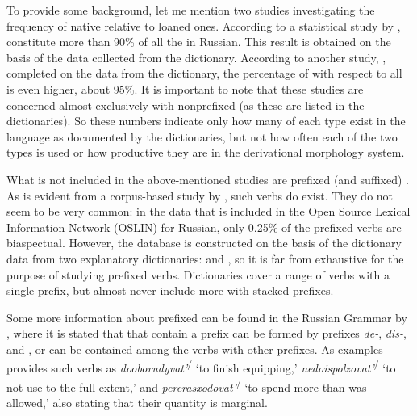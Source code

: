 To provide some background, let me mention two studies investigating the frequency of native  relative to loaned ones. According to a statistical study by \citet{Certkova:98},  constitute more than 90\% of all the  in Russian. This result is obtained on the basis of the data collected from the \citet{Ozegov:90} dictionary. According to another study, \citet{Anderson:02}, completed on the data from the \citet{Zaliznjak:77} dictionary, the percentage of  with respect to all  is even higher, about 95\%. It is important to note that these studies are concerned almost exclusively with nonprefixed  (as these are listed in the dictionaries). So these numbers indicate only how many  of each type exist in the language as documented by the dictionaries, but not how often each of the two types is used or how productive they are in the derivational morphology system.

What is not included in the above-mentioned studies are prefixed (and suffixed) . As is evident from a corpus-based study by \citet{Borik:12}, such verbs do exist. They do not seem to be very common: in the data that is included in the Open Source Lexical Information Network (OSLIN) for Russian, only 0.25\% of the prefixed verbs are biaspectual. However, the database is constructed on the basis of the dictionary data from two explanatory dictionaries: \citet{Ushakov:50} and \citet{OzegovShvedova:92}, so it is far from exhaustive for the purpose of studying prefixed verbs. Dictionaries cover a range of verbs with a single prefix, but almost never include more  with stacked prefixes. 

Some more information about prefixed  can be found in the Russian Grammar by \citet{Shvedova:82}, where it is stated that  that contain a prefix can be formed by  prefixes \textit {de-}, \textit {dis-}, and , or can be contained among the verbs with other prefixes. As examples \citet{Shvedova:82} provides such verbs as  \textit{dooborudyvat'}\textsuperscript{\IPF\slash\PF} `to finish equipping,' \textit{nedoispolzovat'}\textsuperscript{\IPF\slash\PF} `to not use to the full extent,' and \textit{pererasxodovat'}\textsuperscript{\IPF\slash\PF} `to spend more than was allowed,' also stating that their quantity is marginal. 

